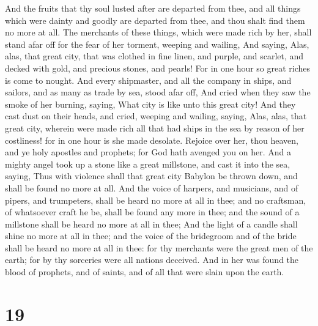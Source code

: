  And the fruits that thy soul lusted after are departed
from thee, and all things which were dainty and goodly are departed from
thee, and thou shalt find them no more at all.  The
merchants of these things, which were made rich by her, shall stand afar
off for the fear of her torment, weeping and wailing, 
And saying, Alas, alas, that great city, that was clothed in fine linen,
and purple, and scarlet, and decked with gold, and precious stones, and
pearls!  For in one hour so great riches is come to
nought. And every shipmaster, and all the company in ships, and sailors,
and as many as trade by sea, stood afar off,  And cried
when they saw the smoke of her burning, saying, What city is like unto
this great city!  And they cast dust on their heads, and
cried, weeping and wailing, saying, Alas, alas, that great city, wherein
were made rich all that had ships in the sea by reason of her
costliness! for in one hour is she made desolate. 
Rejoice over her, thou heaven, and ye holy apostles and prophets; for
God hath avenged you on her.  And a mighty angel took up
a stone like a great millstone, and cast it into the sea, saying, Thus
with violence shall that great city Babylon be thrown down, and shall be
found no more at all.  And the voice of harpers, and
musicians, and of pipers, and trumpeters, shall be heard no more at all
in thee; and no craftsman, of whatsoever craft he be, shall be found any
more in thee; and the sound of a millstone shall be heard no more at all
in thee;  And the light of a candle shall shine no more
at all in thee; and the voice of the bridegroom and of the bride shall
be heard no more at all in thee: for thy merchants were the great men of
the earth; for by thy sorceries were all nations deceived.
 And in her was found the blood of prophets, and of
saints, and of all that were slain upon the earth.

\hypertarget{section-18}{%
\section{19}\label{section-18}}

